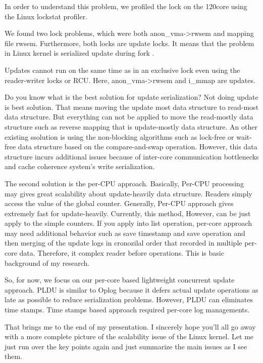 In order to understand this problem, we profiled the lock on the 120core using
the Linux lockstat profiler.

We found two lock problems, which were both anon_vma->rwsem and  mapping file rwsem.
Furthermore, both locks are update locks.
It means that the problem in Linux kernel is serialized update during fork .

Updates cannot run on the same time as in an exclusive lock even
using the reader-writer locks or RCU.
Here, anon_vma->rwsem and i_mmap are updates.

Do you know what is the best solution for update serialization?
Not doing update is best solution.
That means moving the update most data structure to read-most data structure.
But everything can not be applied to move the read-mostly data structure such
as reverse mapping that is update-mostly data structure.
An other existing ssolution is using the non-blocking algorithms such as
lock-free or wait-free data structure based on the compare-and-swap operation.
However, this data structure incurs additional issues because of inter-core
communication bottlenecks and cache coherence system's write serialization.

The second solution is the per-CPU approach.
Basically, Per-CPU processing may gives great scalability about update-heavily
data structure.
Readers simply access the value of the global counter.
Generally, Per-CPU approach gives extremely fast for update-heavily.
Currently, this method, However, can be just apply to the simple counters.
If you apply into list operation, per-core approach may need additional
behavior such as save timestamp and save operation and then merging of the
update logs in cronozilal order that recorded in multiple per-core data.
Therefore, it complex reader before operations.
This is basic background of my research.

So, for now, we focus on our per-core based lightweight concurrent update
approach.
PLDU is similar to Oplog because it defers actual update operations as late
as possible to reduce serialization problems.
However, PLDU can eliminates time stamps.
Time stamps based approach required per-core log managements.

That brings me to the end of my presentation.
I sincerely hope you'll all go away with a more complete picture of the
scalability issue of the Linux kernel.
Let me just run over the key points again and just summarize the main issues as
I see them.

